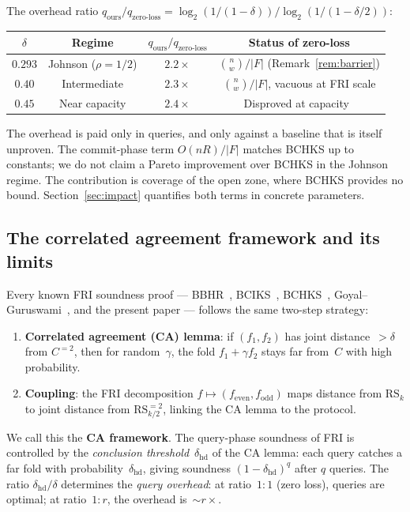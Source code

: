 \documentclass[11pt]{article}
\newcommand{\RS}{\mathrm{RS}}
\begin{document}
The overhead ratio $q_{\text{ours}}/q_{\text{zero-loss}} = \log_2(1/(1-\delta)) / \log_2(1/(1-\delta/2))$:

\begin{center}
\small
\begin{tabular}{cccc}
\toprule
$\delta$ & Regime & $q_{\text{ours}}/q_{\text{zero-loss}}$ & Status of zero-loss \\
\midrule
$0.293$ & Johnson ($\rho = 1/2$) & $2.2\times$ & $\binom{n}{w}/|F|$ (Remark~\ref{rem:barrier}) \\
$0.40$ & Intermediate & $2.3\times$ & $\binom{n}{w}/|F|$, vacuous at FRI scale \\
$0.45$ & Near capacity & $2.4\times$ & Disproved at capacity~\cite{CritesStewart,Kambire} \\
\bottomrule
\end{tabular}
\end{center}

The overhead is paid only in queries, and only against a baseline that is itself unproven. The commit-phase term $O(nR)/|F|$ matches BCHKS up to constants; we do not claim a Pareto improvement over BCHKS in the Johnson regime. The contribution is coverage of the open zone, where BCHKS provides no bound. Section~\ref{sec:impact} quantifies both terms in concrete parameters.

\subsection{The correlated agreement framework and its limits}
\label{sec:ca-framework}

Every known FRI soundness proof --- BBHR~\cite{BBHR}, BCIKS~\cite{BCIKS}, BCHKS~\cite{BCHKS}, Goyal--Guruswami~\cite{GoyalGuruswami}, and the present paper --- follows the same two-step strategy:
\begin{enumerate}[nosep]
\item \textbf{Correlated agreement (CA) lemma}: if $(f_1, f_2)$ has joint distance~$> \delta$ from $C^{=2}$, then for random~$\gamma$, the fold $f_1 + \gamma f_2$ stays far from~$C$ with high probability.
\item \textbf{Coupling}: the FRI decomposition $f \mapsto (f_{\mathrm{even}}, f_{\mathrm{odd}})$ maps distance from $\RS_k$ to joint distance from $\RS_{k/2}^{=2}$, linking the CA lemma to the protocol.
\end{enumerate}
We call this the \textbf{CA framework}. The query-phase soundness of FRI is controlled by the \emph{conclusion threshold}~$\delta_{\mathrm{hd}}$ of the CA lemma: each query catches a far fold with probability~$\delta_{\mathrm{hd}}$, giving soundness $(1 - \delta_{\mathrm{hd}})^q$ after $q$ queries. The ratio $\delta_{\mathrm{hd}} / \delta$ determines the \emph{query overhead}: at ratio~$1{:}1$ (zero loss), queries are optimal; at ratio~$1{:}r$, the overhead is~${\sim}r\times$.
\end{document}
